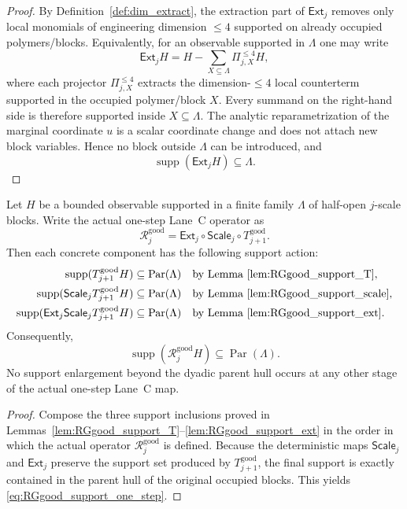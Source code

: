\begin{proof}
By Definition~\ref{def:dim_extract}, the extraction part of $\mathsf{Ext}_j$ removes only local monomials of engineering dimension $\le 4$ supported on already occupied polymers/blocks.
Equivalently, for an observable supported in $\Lambda$ one may write
\[
\mathsf{Ext}_jH
=
H-\sum_{X\subseteq \Lambda}\Pi^{\le 4}_{j,X}H,
\]
where each projector $\Pi^{\le 4}_{j,X}$ extracts the dimension-$\le 4$ local counterterm supported in the occupied polymer/block $X$.
Every summand on the right-hand side is therefore supported inside $X\subseteq \Lambda$.
The analytic reparametrization of the marginal coordinate $u$ is a scalar coordinate change and does not attach new block variables.
Hence no block outside $\Lambda$ can be introduced, and
\[
\operatorname{supp}(\mathsf{Ext}_jH)\subseteq \Lambda.
\]
\end{proof}

\begin{proposition}\label{prop:RGgood_support_one_step}
Let $H$ be a bounded observable supported in a finite family $\Lambda$ of half-open $j$-scale blocks.
Write the actual one-step Lane~C operator as
\[
\mathcal R_j^{\mathrm{good}}=\mathsf{Ext}_j\circ \mathsf{Scale}_j\circ T_{j+1}^{\mathrm{good}}.
\]
Then each concrete component has the following support action:
\begin{align*}
\operatorname{supp}(T_{j+1}^{\mathrm{good}}H)&\subseteq \operatorname{Par}(\Lambda) &&\text{by Lemma~\ref{lem:RGgood_support_T}},\\
\operatorname{supp}(\mathsf{Scale}_jT_{j+1}^{\mathrm{good}}H)&\subseteq \operatorname{Par}(\Lambda) &&\text{by Lemma~\ref{lem:RGgood_support_scale}},\\
\operatorname{supp}(\mathsf{Ext}_j\mathsf{Scale}_jT_{j+1}^{\mathrm{good}}H)&\subseteq \operatorname{Par}(\Lambda) &&\text{by Lemma~\ref{lem:RGgood_support_ext}}.
\end{align*}
Consequently,
\begin{equation}\label{eq:RGgood_support_one_step}
\operatorname{supp}(\mathcal R_j^{\mathrm{good}}H)\subseteq \operatorname{Par}(\Lambda).
\end{equation}
No support enlargement beyond the dyadic parent hull occurs at any other stage of the actual one-step Lane~C map.
\end{proposition}

\begin{proof}
Compose the three support inclusions proved in Lemmas~\ref{lem:RGgood_support_T}--\ref{lem:RGgood_support_ext} in the order in which the actual operator $\mathcal R_j^{\mathrm{good}}$ is defined.
Because the deterministic maps $\mathsf{Scale}_j$ and $\mathsf{Ext}_j$ preserve the support set produced by $T_{j+1}^{\mathrm{good}}$, the final support is exactly contained in the parent hull of the original occupied blocks.
This yields \eqref{eq:RGgood_support_one_step}.
\end{proof}

